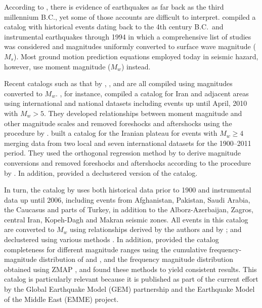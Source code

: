 According to \citet{Ambraseys2005}, there is evidence of earthquakes as far back as the third millennium B.C., yet some of those accounts are difficult to interpret. \citet{Mirzaei1997} compiled a catalog with historical events dating back to the 4th century B.C.~and instrumental earthquakes through 1994 in which a comprehensive list of studies was considered and magnitudes uniformly converted to surface wave magnitude ($M_s$). Most ground motion prediction equations employed today in seismic hazard, however, use moment magnitude ($M_w$) instead. 

Recent catalogs such as that by \citet{Karimiparidari2013}, \citet{Shahvar2013}, and \citet{Zare2014} are all compiled using magnitudes converted to $M_w$. \citet{Karimiparidari2013}, for instance, compiled a catalog for Iran and adjacent areas using international and national datasets including events up until April, 2010 with $M_w > 5$. They developed relationships between moment magnitude and other magnitude scales and removed foreshocks and aftershocks using the procedure by \citet{Gardner1974}. \citet{Shahvar2013} built a catalog for the Iranian plateau for events with $M_w \geq 4$ merging data from two local and seven international datasets for the 1900--2011 period. They used the orthogonal regression method by \citet{Castellaro2006} to derive magnitude conversions and removed foreshocks and aftershocks according to the procedure by \citet{Uhrhammer_1986_EN}. In addition, \citet{Shahvar2013} provided a declustered version of the catalog. 

In turn, the catalog by \citet{Zare2014} uses both historical data prior to 1900 and instrumental data up until 2006, including events from Afghanistan, Pakis\-tan, Saudi Arabia, the Caucasus and parts of Turkey, in addition to the Alborz-Azerbaijan, Zagros, central Iran, Kopeh-Dagh and Makran seismic zones. All events in this catalog are converted to $M_w$ using relationships derived by the authors and by \citet{Escordilis_2006_JS}; and declustered using various methods \citep{Gardner1974, Reasenberg1985, Uhrhammer_1986_EN}. In addition, \citet{Zare2014} provided the catalog completeness for different magnitude ranges using the cumulative frequency-magnitude distribution of \citet{Gutenberg1944} and \citet{richter1958}, and the frequency magnitude distribution obtained using ZMAP \citep{Wiemer2001}, and found these methods to yield consistent results. This catalog is particularly relevant because it is published as part of the current effort by the Global Earthquake Model (GEM) partnership and the Earthquake Model of the Middle East (EMME) project.

